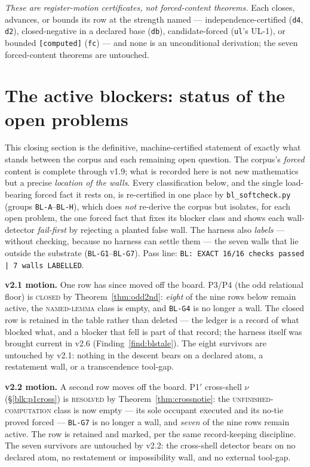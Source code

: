 \documentclass[11pt]{article}
\newcommand{\hx}[1]{\textcolor{cC}{\footnotesize\texttt{#1}}}
\theoremstyle{plain}
\theoremstyle{definition}
\theoremstyle{remark}
\begin{document}
\emph{These are register-motion certificates, not forced-content theorems.} Each
closes, advances, or bounds its row at the strength named --- independence-certified
(\texttt{d4}, \texttt{d2}), closed-negative in a declared base (\texttt{db}),
candidate-forced (\texttt{ul}'s \textsc{UL-1}), or bounded \texttt{[computed]}
(\texttt{fc}) --- and none is an unconditional derivation; the seven forced-content
theorems are untouched.

\section{The active blockers: status of the open problems}\label{sec:blockers}

This closing section is the definitive, machine-certified statement of exactly
what stands between the corpus and each remaining open question. The corpus's
\emph{forced} content is complete through v1.9; what is recorded here is not new
mathematics but a precise \emph{location of the walls}. Every classification
below, and the single load-bearing forced fact it rests on, is re-certified in
one place by \texttt{bl\_softcheck.py} (groups \hx{BL-A}--\hx{BL-H}), which does
\emph{not} re-derive the corpus but isolates, for each open problem, the one
forced fact that fixes its blocker class and shows each wall-detector
\emph{fail-first} by rejecting a planted false wall. The harness also
\emph{labels} --- without checking, because no harness can settle them --- the
seven walls that lie outside the substrate (\hx{BL-G1}--\hx{BL-G7}). Pass line:
\texttt{BL: EXACT 16/16 checks passed | 7 walls LABELLED}.

\smallskip\noindent
\textbf{v2.1 motion.} One row has since moved off the board. P3/P4 (the odd
relational floor) is \textsc{closed} by Theorem~\ref{thm:odd2nd}: \emph{eight}
of the nine rows below remain active, the \textsc{named-lemma} class is empty,
and \hx{BL-G4} is no longer a wall. The closed row is retained in the table
rather than deleted --- the ledger is a record of what blocked what, and a
blocker that fell is part of that record; the harness itself was brought current
in v2.6 (Finding~\ref{find:blstale}).
The eight survivors are untouched by v2.1: nothing in the descent bears on a
declared atom, a restatement wall, or a transcendence tool-gap.

\smallskip\noindent
\textbf{v2.2 motion.} A second row moves off the board. P1$'$ cross-shell $\nu$
(\S\ref{blk:p1cross}) is \textsc{resolved} by Theorem~\ref{thm:crossnotie}: the
\textsc{unfinished-computation} class is now empty --- its sole occupant executed
and its no-tie proved forced --- \hx{BL-G7} is no longer a wall, and \emph{seven}
of the nine rows remain active. The row is retained and marked, per the same
record-keeping discipline. The seven survivors are untouched by v2.2: the
cross-shell detector bears on no declared atom, no restatement or impossibility
wall, and no external tool-gap.
\end{document}
